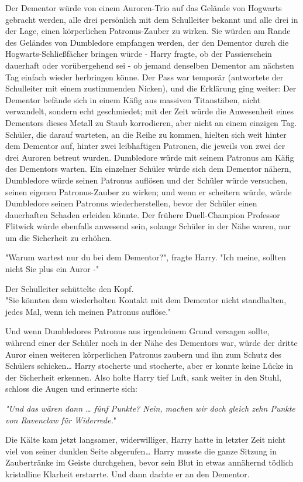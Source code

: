 {Der Dementor würde von einem Auroren-Trio auf das Gelände von Hogwarts gebracht werden, alle drei persönlich mit dem Schulleiter bekannt und alle drei in der Lage, einen körperlichen Patronus-Zauber zu wirken. Sie würden am Rande des Geländes von Dumbledore empfangen werden, der den Dementor durch die Hogwarts-Schließfächer bringen würde - Harry fragte, ob der Passierschein dauerhaft oder vorübergehend sei - ob jemand denselben Dementor am nächsten Tag einfach wieder herbringen könne. Der Pass war temporär (antwortete der Schulleiter mit einem zustimmenden Nicken), und die Erklärung ging weiter: Der Dementor befände sich in einem Käfig aus massiven Titanstäben, nicht verwandelt, sondern echt geschmiedet; mit der Zeit würde die Anwesenheit eines Dementors dieses Metall zu Staub korrodieren, aber nicht an einem einzigen Tag. Schüler, die darauf warteten, an die Reihe zu kommen, hielten sich weit hinter dem Dementor auf, hinter zwei leibhaftigen Patronen, die jeweils von zwei der drei Auroren betreut wurden. Dumbledore würde mit seinem Patronus am Käfig des Dementors warten. Ein einzelner Schüler würde sich dem Dementor nähern, Dumbledore würde seinen Patronus auflösen und der Schüler würde versuchen, seinen eigenen Patronus-Zauber zu wirken; und wenn er scheitern würde, würde Dumbledore seinen Patronus wiederherstellen, bevor der Schüler einen dauerhaften Schaden erleiden könnte. Der frühere Duell-Champion Professor Flitwick würde ebenfalls anwesend sein, solange Schüler in der Nähe waren, nur um die Sicherheit zu erhöhen.

"Warum wartest nur du bei dem Dementor?", fragte Harry. "Ich meine, sollten nicht Sie plus ein Auror -"

Der Schulleiter schüttelte den Kopf.\\ "Sie könnten dem wiederholten Kontakt mit dem Dementor nicht standhalten, jedes Mal, wenn ich meinen Patronus auflöse."

Und wenn Dumbledores Patronus aus irgendeinem Grund versagen sollte, während einer der Schüler noch in der Nähe des Dementors war, würde der dritte Auror einen weiteren körperlichen Patronus zaubern und ihn zum Schutz des Schülers schicken… Harry stocherte und stocherte, aber er konnte keine Lücke in der Sicherheit erkennen. Also holte Harry tief Luft, sank weiter in den Stuhl, schloss die Augen und erinnerte sich:

\emph{"Und das wären dann … fünf Punkte? Nein, machen wir doch gleich zehn Punkte von Ravenclaw für Widerrede.}"

Die Kälte kam jetzt langsamer, widerwilliger, Harry hatte in letzter Zeit nicht viel von seiner dunklen Seite abgerufen… Harry musste die ganze Sitzung in Zaubertränke im Geiste durchgehen, bevor sein Blut in etwas annähernd tödlich kristalline Klarheit erstarrte. Und dann dachte er an den Dementor.

}
